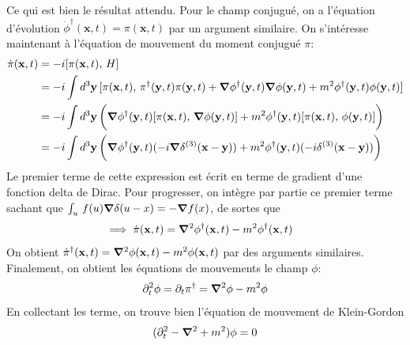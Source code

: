 \documentclass{article}
\numberwithin{equation}{section}
\begin{document}
Ce qui est bien le résultat attendu. Pour le champ conjugué, on a l'équation d'évolution $\dot{\phi}^{\dagger}(\mathbf{x}, t) = \pi(\mathbf{x}, t)$ par 
un argument similaire. On s'intéresse maintenant à l'équation de mouvement du moment conjugué $\pi$:
\begingroup
\allowdisplaybreaks
\begin{align*}
        \dot{\pi}(\mathbf{x}, t) &= -i[\pi(\mathbf{x}, t), \, H] \\
                &= -i \int d^{3}\mathbf{y}\, 
        [\pi(\mathbf{x}, t),\, 
                \pi^{\dagger}(\mathbf{y}, t) \pi(\mathbf{y},t)
                + \grad \phi^{\dagger}(\mathbf{y}, t) \grad \phi(\mathbf{y}, t) 
                + m^2 \phi^{\dagger}(\mathbf{y}, t) \phi(\mathbf{y}, t)
        ]\\
        &= -i \int d^{3}\mathbf{y}\,
        \bigg(  
        \grad \phi^{\dagger}(\mathbf{y}, t)
        [\pi(\mathbf{x}, t),\, \grad \phi(\mathbf{y}, t)]
        + m^2 \phi^{\dagger}(\mathbf{y}, t) [\pi(\mathbf{x}, t),\, \phi(\mathbf{y}, t)] 
        \bigg)\\
        &= -i \int d^{3}\mathbf{y}\, \bigg( 
        \grad \phi^{\dagger}(\mathbf{y}, t) (-i\grad\delta^{(3)}(\mathbf{x} - \mathbf{y})) + m^2 \phi^{\dagger}(\mathbf{y}, t)(-i \delta^{(3)}(\mathbf{x} - \mathbf{y}))
        \bigg)
\end{align*}
\endgroup
Le premier terme de cette expression est écrit en terme de gradient d'une fonction delta de Dirac. Pour progresser, on intègre par partie 
ce premier terme sachant que $\int_u\, f(u) \grad \delta(u - x) = -\grad f(x)$, de sortes que
\begin{align*}
         \implies \dot{\pi}(\mathbf{x}, t) &= 
         \grad^2 \phi^{\dagger}(\mathbf{x}, t) - m^2 \phi^{\dagger}(\mathbf{x}, t)     
\end{align*}
On obtient $\dot{\pi}^{\dagger}(\mathbf{x}, t) = \grad^{2} \phi(\mathbf{x}, t) - m^{2}\phi(\mathbf{x}, t)$ par des arguments similaires. Finalement, on
obtient les équations de mouvements le champ $\phi$:
\begin{equation}
        \partial_t^{2} \phi = \partial_t \pi^{\dagger} = \grad^{2}\phi - m^{2} \phi
\end{equation} 
En collectant les terme, on trouve bien l'équation de mouvement de Klein-Gordon
\begin{equation}
        (\partial_t^2 - \grad^2 + m^2) \phi = 0
\end{equation} 

\subsection{}
\end{document}
